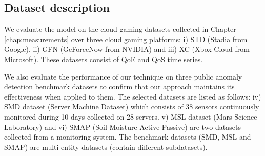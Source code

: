 \subsection{Dataset description}

We evaluate the model on the cloud gaming datasets collected in Chapter \ref{chap:measurements} over three cloud gaming platforms: i) STD (Stadia from Google), ii) GFN (GeForceNow from NVIDIA) and iii) XC (Xbox Cloud from Microsoft). These datasets consist of \ac{QoE} and \ac{QoS} time series.

We also evaluate the performance of our technique on three public anomaly detection benchmark datasets to confirm that our approach maintains its effectiveness when applied to them. The selected datasets are listed as follows: iv) SMD dataset (Server Machine Dataset) which consists of 38 sensors continuously monitored during 10 days collected on 28 servers. v) MSL dataset (Mars Science Laboratory) and vi) SMAP (Soil Moisture Active Passive) are two datasets collected from a monitoring system. The benchmark datasets (SMD, MSL and SMAP) are multi-entity datasets (contain different subdatasets).









